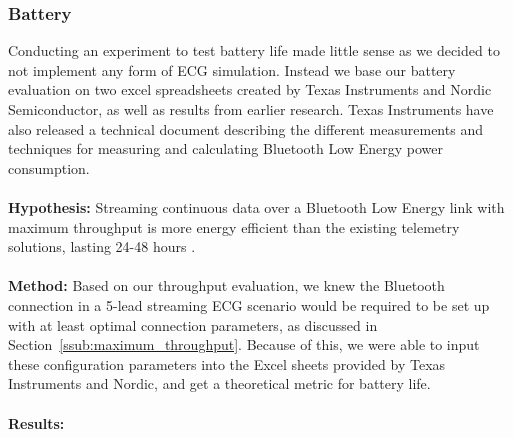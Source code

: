 
\subsubsection{Battery} %
\label{ssub:battery}

Conducting an experiment to test battery life made little sense as we decided to not implement any form of ECG simulation. Instead we base our battery evaluation on two excel spreadsheets created by Texas Instruments and Nordic Semiconductor, as well as results from earlier research. Texas Instruments have also released a technical document \cite{TIbatteryCalculations} describing the different measurements and techniques for measuring and calculating Bluetooth Low Energy power consumption.
\\
\\
\noindent %
\textbf{Hypothesis:} Streaming continuous data over a Bluetooth Low Energy link with maximum throughput is more energy efficient than the existing telemetry solutions, lasting 24-48 hours \cite{philipsIntellivueTrancievers}.
\\
\\
\noindent
\textbf{Method:} Based on our throughput evaluation, we knew the  Bluetooth connection in a 5-lead streaming ECG scenario would be required to be set up with at least optimal connection parameters, as discussed in Section~\ref{ssub:maximum_throughput}. Because of this, we were able to input these configuration parameters into the Excel sheets provided by Texas Instruments and Nordic, and get a theoretical metric for battery life.
\\
\\
\noindent
\textbf{Results:} 
